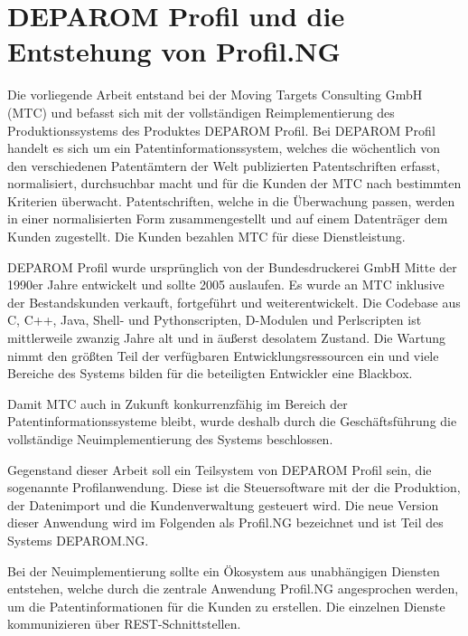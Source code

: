 
\chapter{DEPAROM Profil und die Entstehung von Profil.NG} %

\label{ch:profil.ng} %


Die vorliegende Arbeit entstand bei der Moving Targets Consulting GmbH (MTC) und
befasst sich mit der vollständigen Reimplementierung des Produktionssystems des
Produktes DEPAROM Profil. Bei DEPAROM Profil handelt es sich um ein
Patentinformationssystem, welches die wöchentlich von den verschiedenen
Patentämtern der Welt publizierten Patentschriften erfasst, normalisiert,
durchsuchbar macht und für die Kunden der MTC nach bestimmten Kriterien
überwacht. Patentschriften, welche in die Überwachung passen, werden in einer
normalisierten Form zusammengestellt und auf einem Datenträger dem Kunden
zugestellt. Die Kunden bezahlen MTC für diese Dienstleistung.

DEPAROM Profil wurde ursprünglich von der Bundesdruckerei GmbH Mitte der 1990er
Jahre entwickelt und sollte 2005 auslaufen. Es wurde an MTC inklusive der
Bestandskunden verkauft, fortgeführt und weiterentwickelt. Die Codebase aus C,
C++, Java, Shell- und Pythonscripten, D-Modulen und Perlscripten ist
mittlerweile zwanzig Jahre alt und in äußerst desolatem Zustand. Die Wartung
nimmt den größten Teil der verfügbaren Entwicklungsressourcen ein und viele
Bereiche des Systems bilden für die beteiligten Entwickler eine Blackbox.

Damit MTC auch in Zukunft konkurrenzfähig im Bereich der
Patentinformationssysteme bleibt, wurde deshalb durch die Geschäftsführung die
vollständige Neuimplementierung des Systems beschlossen.

Gegenstand dieser Arbeit soll ein Teilsystem von DEPAROM Profil sein, die
sogenannte Profilanwendung. Diese ist die Steuersoftware mit der die Produktion,
der Datenimport und die Kundenverwaltung gesteuert wird. Die neue Version dieser
Anwendung wird im Folgenden als Profil.NG bezeichnet und ist Teil des Systems
DEPAROM.NG.

Bei der Neuimplementierung sollte ein Ökosystem aus unabhängigen Diensten
entstehen, welche durch die zentrale Anwendung Profil.NG angesprochen werden, um
die Patentinformationen für die Kunden zu erstellen. Die einzelnen Dienste
kommunizieren über REST-Schnittstellen.

